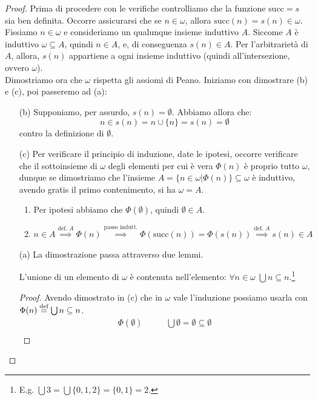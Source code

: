 \begin{proof}
	Prima di procedere con le verifiche controlliamo che la funzione $\text{succ} = s$ sia ben definita.
	Occorre assicurarsi che se $n \in \omega$, allora $\text{succ}(n) = s(n) \in \omega$. Fissiamo $n \in \omega$
	e consideriamo un qualunque insieme induttivo $A$. Siccome $A$ è induttivo $\omega \subseteq A$, quindi $n \in A$, e, di conseguenza $s(n) \in A$. Per 
	l'arbitrarietà di $A$, allora, $s(n)$ appartiene a ogni insieme induttivo (quindi all'intersezione, ovvero $\omega$).\\
	Dimostriamo ora che $\omega$ rispetta gli assiomi di Peano. Iniziamo con dimostrare (b) e (c), poi passeremo ad (a):
	\begin{enumerate}
		\item[(b)] Supponiamo, per assurdo, $s(n) = \emptyset$. Abbiamo allora che:
		\[ n \in s(n) =  n \cup \{n\} = s(n) = \emptyset
			\]
		contro la definizione di $\emptyset$.
		\item[(c)] Per verificare il principio di induzione, date le ipotesi, occorre verificare che il sottoinsieme di $\omega$ degli elementi per cui è vera $\Phi(n)$ è proprio tutto $\omega$, dunque 
		se dimostriamo che l'insieme $A = \{n \in \omega | \Phi(n)\} \subseteq \omega$ è induttivo, avendo gratis il primo contenimento, si ha $\omega = A$.
		\begin{enumerate}[(1)]
			\item Per ipotesi abbiamo che $\Phi(\emptyset)$, quindi $\emptyset \in A$.
			\item $n \in A \overset{\text{def. $A$}}{\implies} \Phi(n) \overset{\text{passo indutt.}}{\implies} \Phi(\text{succ}(n)) = \Phi(s(n)) \overset{\text{def. $A$}}{\implies} s(n) \in A$
		\end{enumerate}
		\item[(a)] La dimostrazione passa attraverso due lemmi.
					\begin{lemma}
					[Lemma 1]
					L'unione di un elemento di $\omega$ è contenuta nell'elemento: $\forall n \in \omega \; \bigcup n \subseteq n$.\footnote{E.g. $\bigcup 3 = \bigcup \{0,1,2\} = \{0,1\} = 2$.}
					\end{lemma}
					\begin{proof}
						Avendo dimostrato in (c) che in $\omega$ vale l'induzione possiamo usarla con $\Phi(n) \overset{\text{def}}{=} \bigcup n \subseteq n$. 
						\[
							\begin{split}
							\boxed{\Phi(\emptyset)} & \qquad \bigcup \emptyset = \emptyset \subseteq \emptyset \\

\end{split}\]
\end{proof}
\end{enumerate}
\end{proof}
